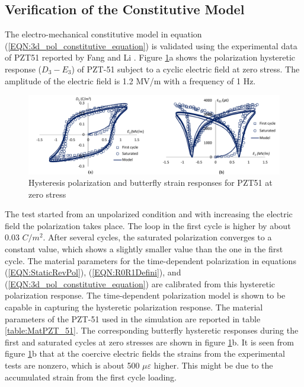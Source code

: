 \subsection{Verification of the Constitutive Model} 
The electro-mechanical constitutive model in equation (\ref{EQN:3d_pol_constitutive_equation}) is validated using the experimental data of PZT51 reported by Fang and Li \cite{Li2004959}. 
Figure \ref{fig:hysteresis_polarization_butterfly_strainres_ponsespzt_51_zerostress}a shows the polarization hysteretic response ($D_3-E_3$) of PZT-51 subject to a cyclic electric field at zero stress. 
The amplitude of the electric field is 1.2 MV/m with a frequency of 1 Hz. 
\begin{figure}
\centering
\includegraphics[width=6.0in]{./chap_2_pol_sw/figures/hysteresis_polarization_butterfly_strainres_ponsespzt_51_zero_stress.pdf}
\caption{Hysteresis polarization and butterfly strain responses for PZT51 at zero stress}
\label{fig:hysteresis_polarization_butterfly_strainres_ponsespzt_51_zerostress}
\end{figure}
The test started from an unpolarized condition and with increasing the electric field the polarization takes place. 
The loop in the first cycle is higher by about 0.03 $C/m^2$. 
After several cycles, the saturated polarization converges to a constant value, which shows a slightly smaller value than the one in the first cycle. 
The material parameters for the time-dependent polarization in equations (\ref{EQN:StaticRevPol}), (\ref{EQN:R0R1Defini}), and (\ref{EQN:3d_pol_constitutive_equation}) are calibrated from this hysteretic polarization response. 
The time-dependent polarization model is shown to be capable in capturing the hysteretic polarization response. 
The material parameters of the PZT-51 used in the simulation are reported in table \ref{table:MatPZT_51}. 
The corresponding butterfly hysteretic responses during the first and saturated cycles at zero stresses are shown in figure \ref{fig:hysteresis_polarization_butterfly_strainres_ponsespzt_51_zerostress}b. 
It is seen from figure \ref{fig:hysteresis_polarization_butterfly_strainres_ponsespzt_51_zerostress}b that at the coercive electric fields the strains from the experimental tests are nonzero, which is about 500 $\mu \varepsilon$ higher. 
This might be due to the accumulated strain from the first cycle loading. 

